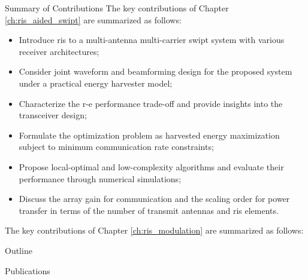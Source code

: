 \begin{section}{Summary of Contributions}
	The key contributions of Chapter \ref{ch:ris_aided_swipt} are summarized as follows:
	\begin{itemize}
		\item Introduce \gls{ris} to a multi-antenna multi-carrier \gls{swipt} system with various receiver architectures;
		\item Consider joint waveform and beamforming design for the proposed system under a practical energy harvester model;
		\item Characterize the \gls{r-e} performance trade-off and provide insights into the transceiver design;
		\item Formulate the optimization problem as harvested energy maximization subject to minimum communication rate constraints;
		\item Propose local-optimal and low-complexity algorithms and evaluate their performance through numerical simulations;
		\item Discuss the array gain for communication and the scaling order for power transfer in terms of the number of transmit antennas and \gls{ris} elements.
	\end{itemize}

	The key contributions of Chapter \ref{ch:ris_modulation} are summarized as follows:
\end{section}

\begin{section}{Outline}

\end{section}

\begin{section}{Publications}
\end{section}
